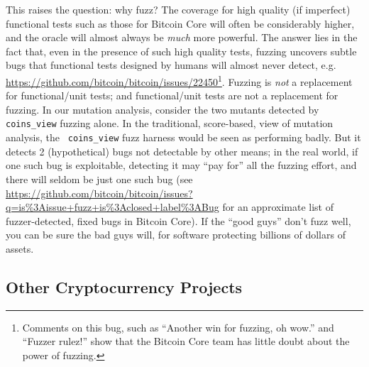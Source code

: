 This raises the question:  why fuzz?  The coverage for high quality
(if imperfect) functional tests such as those for Bitcoin Core will
often be considerably
higher, and the oracle will almost always be \emph{much} more powerful.  The answer lies in the
fact that, even in the presence of such high quality tests, fuzzing
uncovers subtle bugs that functional tests designed by humans will
almost never detect,
e.g. \url{https://github.com/bitcoin/bitcoin/issues/22450}\footnote{Comments
  on this bug, such as ``Another win for fuzzing, oh wow.'' and
  ``Fuzzer rulez!'' show that the Bitcoin Core team has little doubt
  about the power of fuzzing.}.  Fuzzing is \emph{not} a replacement
for functional/unit tests; and functional/unit tests are not a
replacement for fuzzing.  In our mutation analysis, consider the two
mutants detected by {\tt coins\_view} fuzzing alone.  In the
traditional, score-based, view of mutation analysis, the {\tt
  coins\_view} fuzz harness would be seen as performing badly.  But it
detects 2 (hypothetical) bugs not detectable by other means; in the
real world, if one such bug is exploitable, detecting it may ``pay
for'' all the fuzzing effort, and there will seldom be just one such
bug (see
\url{https://github.com/bitcoin/bitcoin/issues?q=is\%3Aissue+fuzz+is\%3Aclosed+label\%3ABug}
for an approximate list of fuzzer-detected, fixed bugs in Bitcoin
Core).  If the ``good guys'' don't fuzz well, you can be sure the bad
guys will, for software protecting billions of dollars of assets.

\subsection{Other Cryptocurrency Projects}

